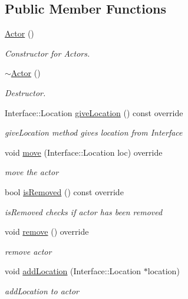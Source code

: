 \subsection*{Public Member Functions}
\begin{DoxyCompactItemize}
\item 
\hyperlink{class_student_side_1_1_actor_a975c8c762266aaa7a77bd66fc4ec52f8}{Actor} ()
\begin{DoxyCompactList}\small\item\em Constructor for Actors. \end{DoxyCompactList}\item 
\hyperlink{class_student_side_1_1_actor_ae5f1f32ef2603cff6d9f91648ad723df}{$\sim$\-Actor} ()
\begin{DoxyCompactList}\small\item\em Destructor. \end{DoxyCompactList}\item 
Interface\-::\-Location \hyperlink{class_student_side_1_1_actor_a7da7be8bf80fd2cb6ecccb5643c5550b}{give\-Location} () const override
\begin{DoxyCompactList}\small\item\em give\-Location method gives location from Interface \end{DoxyCompactList}\item 
void \hyperlink{class_student_side_1_1_actor_ac3027790dbf5d48a783931a39876b16f}{move} (Interface\-::\-Location loc) override
\begin{DoxyCompactList}\small\item\em move the actor \end{DoxyCompactList}\item 
bool \hyperlink{class_student_side_1_1_actor_ae43895e750efd94a11ed0377de1541a2}{is\-Removed} () const override
\begin{DoxyCompactList}\small\item\em is\-Removed checks if actor has been removed \end{DoxyCompactList}\item 
void \hyperlink{class_student_side_1_1_actor_ac5be31d931bf28cfd9044c991ea7ad18}{remove} () override
\begin{DoxyCompactList}\small\item\em remove actor \end{DoxyCompactList}\item 
void \hyperlink{class_student_side_1_1_actor_a9e2ebb8ad1118556222cb153e9a4cd3e}{add\-Location} (Interface\-::\-Location $\ast$location)
\begin{DoxyCompactList}\small\item\em add\-Location to actor \end{DoxyCompactList}\end{DoxyCompactItemize}



